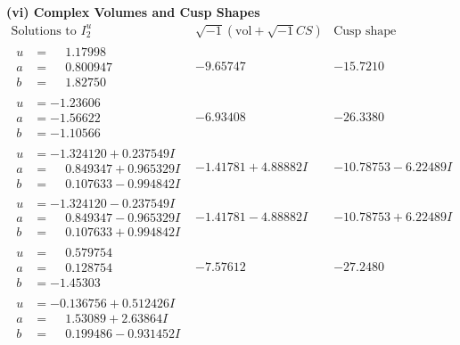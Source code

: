 \documentclass[1p]{elsarticle_modified}
\theoremstyle{definition}
\newcommand{\I}{\sqrt{-1}}
\begin{document}
\newpage\flushleft \textbf{(vi) Complex Volumes and Cusp Shapes}
$$\begin{array}{c|c|c}  
\text{Solutions to }I^u_{2}& \I (\text{vol} + \sqrt{-1}CS) & \text{Cusp shape}\\
 \hline 
\begin{aligned}
u &= \phantom{-}1.17998\phantom{ +0.000000I} \\
a &= \phantom{-}0.800947\phantom{ +0.000000I} \\
b &= \phantom{-}1.82750\phantom{ +0.000000I}\end{aligned}
 & -9.65747\phantom{ +0.000000I} & -15.7210\phantom{ +0.000000I} \\ \hline\begin{aligned}
u &= -1.23606\phantom{ +0.000000I} \\
a &= -1.56622\phantom{ +0.000000I} \\
b &= -1.10566\phantom{ +0.000000I}\end{aligned}
 & -6.93408\phantom{ +0.000000I} & -26.3380\phantom{ +0.000000I} \\ \hline\begin{aligned}
u &= -1.324120 + 0.237549 I \\
a &= \phantom{-}0.849347 + 0.965329 I \\
b &= \phantom{-}0.107633 - 0.994842 I\end{aligned}
 & -1.41781 + 4.88882 I & -10.78753 - 6.22489 I \\ \hline\begin{aligned}
u &= -1.324120 - 0.237549 I \\
a &= \phantom{-}0.849347 - 0.965329 I \\
b &= \phantom{-}0.107633 + 0.994842 I\end{aligned}
 & -1.41781 - 4.88882 I & -10.78753 + 6.22489 I \\ \hline\begin{aligned}
u &= \phantom{-}0.579754\phantom{ +0.000000I} \\
a &= \phantom{-}0.128754\phantom{ +0.000000I} \\
b &= -1.45303\phantom{ +0.000000I}\end{aligned}
 & -7.57612\phantom{ +0.000000I} & -27.2480\phantom{ +0.000000I} \\ \hline\begin{aligned}
u &= -0.136756 + 0.512426 I \\
a &= \phantom{-}1.53089 + 2.63864 I \\
b &= \phantom{-}0.199486 - 0.931452 I\end{aligned}

\end{array}$$
\end{document}
